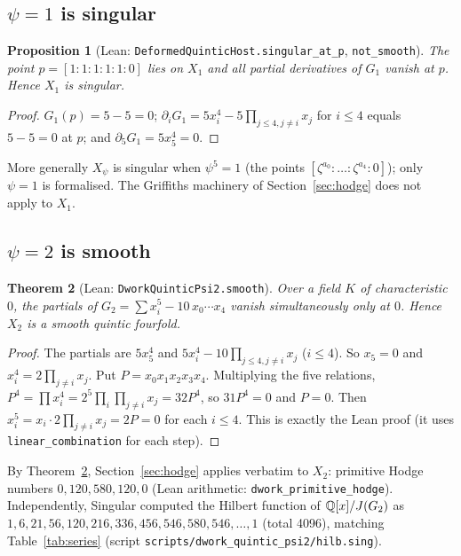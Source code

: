 \documentclass[11pt]{article}
\newtheorem{theorem}{Theorem}[section]\newtheorem{proposition}[theorem]{Proposition}
\theoremstyle{definition}\newtheorem{definition}[theorem]{Definition}\newtheorem{remark}[theorem]{Remark}
\begin{document}
\subsection{$\psi=1$ is singular}
\begin{proposition}[Lean: \texttt{DeformedQuinticHost.singular\_at\_p}, \texttt{not\_smooth}]
The point $p=[1:1:1:1:1:0]$ lies on $X_1$ and all partial derivatives of $G_1$ vanish at $p$.
Hence $X_1$ is singular.
\end{proposition}
\begin{proof}
$G_1(p)=5-5=0$; $\partial_iG_1=5x_i^4-5\prod_{j\le4,j\neq i}x_j$ for $i\le4$ equals $5-5=0$ at $p$; and $\partial_5G_1=5x_5^4=0$.
\end{proof}
More generally $X_\psi$ is singular when $\psi^5=1$ (the points $[\zeta^{a_0}:\dots:\zeta^{a_4}:0]$);
only $\psi=1$ is formalised. The Griffiths machinery of Section~\ref{sec:hodge} does not apply to $X_1$.

\subsection{$\psi=2$ is smooth}
\begin{theorem}[Lean: \texttt{DworkQuinticPsi2.smooth}]\label{thm:psi2}
Over a field $K$ of characteristic $0$, the partials of $G_2=\sum x_i^5-10\,x_0\cdots x_4$ vanish
simultaneously only at $0$. Hence $X_2$ is a smooth quintic fourfold.
\end{theorem}
\begin{proof}
The partials are $5x_5^4$ and $5x_i^4-10\prod_{j\le 4,j\ne i}x_j$ ($i\le4$). So $x_5=0$ and
$x_i^4=2\prod_{j\ne i}x_j$. Put $P=x_0x_1x_2x_3x_4$. Multiplying the five relations,
$P^4=\prod x_i^4=2^5\prod_i\prod_{j\ne i}x_j=32P^4$, so $31P^4=0$ and $P=0$. Then
$x_i^5=x_i\cdot 2\prod_{j\ne i}x_j=2P=0$ for each $i\le4$. This is exactly the Lean proof
(it uses \texttt{linear\_combination} for each step).
\end{proof}
By Theorem~\ref{thm:psi2}, Section~\ref{sec:hodge} applies verbatim to $X_2$: primitive Hodge numbers
$0,120,580,120,0$ (Lean arithmetic: \texttt{dwork\_primitive\_hodge}). Independently, Singular computed
the Hilbert function of $\mathbb{Q}[x]/J(G_2)$ as $1,6,21,56,120,216,336,456,546,580,546,\dots,1$ (total
4096), matching Table~\ref{tab:series} (script \texttt{scripts/dwork\_quintic\_psi2/hilb.sing}).
\end{document}
